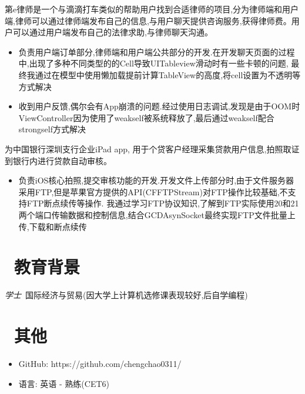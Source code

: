 \documentclass{resume}
\begin{document}
\begin{onehalfspacing}
第e律师是一个与滴滴打车类似的帮助用户找到合适律师的项目,分为律师端和用户端,律师可以通过律师端发布自己的信息,与用户聊天提供咨询服务,获得律师费。用户可以通过用户端发布自己的法律求助,与律师聊天沟通。     
\begin{itemize}
  \item 负责用户端订单部分,律师端和用户端公共部分的开发.在开发聊天页面的过程中,出现了多种不同类型的的Cell导致UITableview滑动时有一些卡顿的问题,
  最终我通过在模型中使用懒加载提前计算TableView的高度,将cell设置为不透明等方式解决
  \item 收到用户反馈,偶尔会有App崩溃的问题.经过使用日志调试,发现是由于OOM时ViewController因为使用了weakself被系统释放了,最后通过weakself配合strongself方式解决
\end{itemize}
\end{onehalfspacing}

\begin{onehalfspacing}
为中国银行深圳支行企业iPad app, 用于个贷客户经理采集贷款用户信息,拍照取证到银行内进行贷款自动审核。     
\begin{itemize}
  \item 负责iOS核心拍照,提交审核功能的开发.开发文件上传部分时,由于文件服务器采用FTP,但是苹果官方提供的API(CFFTPStream)对FTP操作比较基础,不支持FTP断点续传等操作.
  我通过学习FTP协议知识,了解到FTP实际使用20和21两个端口传输数据和控制信息,结合GCDAsynSocket最终实现FTP文件批量上传,下载和断点续传
\end{itemize}
\end{onehalfspacing}

\section{\faGraduationCap\  教育背景}
\textit{学士}\ 国际经济与贸易(因大学上计算机选修课表现较好,后自学编程)

\section{\faInfo\ 其他}
\begin{itemize}[parsep=0.5ex]
  \item GitHub: https://github.com/chengchao0311/
  \item 语言: 英语 - 熟练(CET6)
\end{itemize}

%
%
\end{document}
